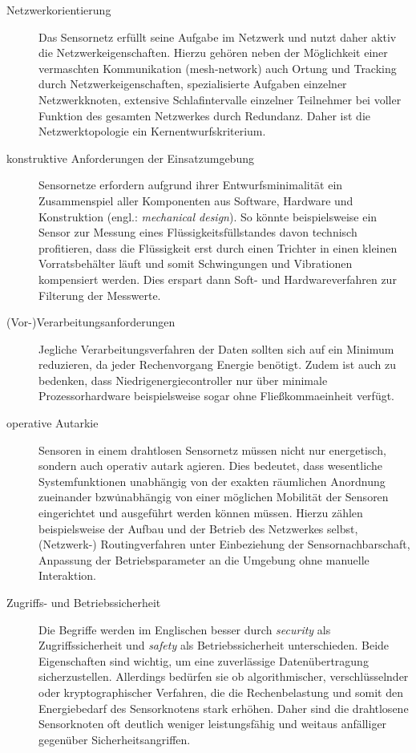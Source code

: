 \begin{description}
	\item [Netzwerkorientierung] Das Sensornetz erfüllt seine Aufgabe im Netzwerk und nutzt daher aktiv die Netzwerkeigenschaften. Hierzu gehören neben der Möglichkeit einer vermaschten Kommunikation (mesh-network) auch Ortung und Tracking durch Netzwerkeigenschaften, spezialisierte Aufgaben einzelner Netzwerkknoten, extensive Schlafintervalle einzelner Teilnehmer bei voller Funktion des gesamten Netzwerkes durch Redundanz. Daher ist die Netzwerktopologie ein Kernentwurfskriterium.
	\item [konstruktive Anforderungen der Einsatzumgebung] Sensornetze erfordern aufgrund ihrer Entwurfsminimalität ein Zusammenspiel aller Komponenten aus Software, Hardware und Konstruktion (engl.: \emph{mechanical design}). So könnte beispielsweise ein Sensor zur Messung eines Flüssigkeitsfüllstandes davon technisch profitieren, dass die Flüssigkeit erst durch einen Trichter in einen kleinen Vorratsbehälter läuft und somit Schwingungen und Vibrationen kompensiert werden. Dies erspart dann Soft- und Hardwareverfahren zur Filterung der Messwerte.
	\item [(Vor-)Verarbeitungsanforderungen] Jegliche Verarbeitungsverfahren der Daten sollten sich auf ein Minimum reduzieren, da jeder Rechenvorgang Energie benötigt. Zudem ist auch zu bedenken, dass Niedrigenergiecontroller nur über minimale Prozessorhardware beispielsweise sogar ohne Fließkommaeinheit verfügt.
	\item [operative Autarkie] Sensoren in einem drahtlosen Sensornetz müssen nicht nur energetisch, sondern auch operativ autark agieren. Dies bedeutet, dass wesentliche Systemfunktionen unabhängig von der exakten räumlichen Anordnung zueinander bzw\. unabhängig von einer möglichen Mobilität der Sensoren eingerichtet und ausgeführt werden können müssen. Hierzu zählen beispielsweise der Aufbau und der Betrieb des Netzwerkes selbst, (Netzwerk-) Routingverfahren unter Einbeziehung der Sensornachbarschaft, Anpassung der Betriebsparameter an die Umgebung ohne manuelle Interaktion.
	\item[Zugriffs- und Betriebssicherheit] Die Begriffe werden im Englischen besser durch \emph{security} als Zugriffssicherheit und \emph{safety} als Betriebssicherheit unterschieden. Beide Eigenschaften sind wichtig, um eine zuverlässige Datenübertragung sicherzustellen. Allerdings bedürfen sie ob algorithmischer, verschlüsselnder oder kryptographischer Verfahren, die die Rechenbelastung und somit den Energiebedarf des Sensorknotens stark erhöhen. Daher sind die drahtlosene Sensorknoten oft deutlich weniger leistungsfähig und weitaus anfälliger gegenüber Sicherheitsangriffen.
\end{description}

